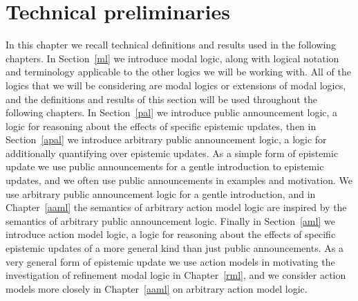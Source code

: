 \chapter{Technical preliminaries}\label{technical}

In this chapter we recall technical definitions and results used in the following chapters.
In Section~\ref{ml} we introduce modal logic, along with logical notation and terminology applicable to the other logics we will be working with.
All of the logics that we will be considering are modal logics or extensions of modal logics, and the definitions and results of this section will be used throughout the following chapters. 
In Section~\ref{pal} we introduce public announcement logic, a logic for reasoning about the effects of specific epistemic updates, then in Section~\ref{apal} we introduce arbitrary public announcement logic, a logic for additionally quantifying over epistemic updates.
As a simple form of epistemic update we use public announcements for a gentle introduction to epistemic updates, and we often use public announcements in examples and motivation.
We use arbitrary public announcement logic for a gentle introduction, and in Chapter~\ref{aaml} the semantics of arbitrary action model logic are inspired by the semantics of arbitrary public announcement logic.
Finally in Section~\ref{aml} we introduce action model logic, a logic for reasoning about the effects of specific epistemic updates of a more general kind than just public announcements.
As a very general form of epistemic update we use action models in motivating the investigation of refinement modal logic in Chapter~\ref{rml}, and we consider action models more closely in Chapter~\ref{aaml} on arbitrary action model logic.





